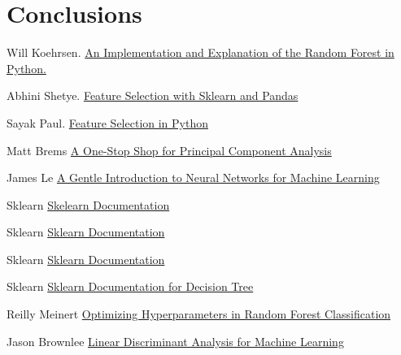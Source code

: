 \documentclass{article}
\begin{document}
\section{Conclusions}

  

\begin{thebibliography}{1}

Will Koehrsen.
\newblock\href{https://towardsdatascience.com/an-implementation-and-explanation-of-the-random-forest-in-python-77bf308a9b76}{ An Implementation and Explanation of the Random Forest in Python.}

Abhini Shetye.
\newblock\href{https://towardsdatascience.com/feature-selection-with-pandas-e3690ad8504b}{Feature Selection with Sklearn and Pandas}

Sayak Paul.
\newblock\href{https://www.datacamp.com/community/tutorials/feature-selection-python}{Feature Selection in Python}

Matt Brems
\newblock\href{https://towardsdatascience.com/a-one-stop-shop-for-principal-component-analysis-5582fb7e0a9c}{A One-Stop Shop for Principal Component Analysis}

James Le
\newblock\href{https://www.codementor.io/@james_aka_yale/a-gentle-introduction-to-neural-networks-for-machine-learning-hkijvz7lp}{A Gentle Introduction to Neural Networks for Machine Learning}

Sklearn
\newblock\href{https://scikit-learn.org/stable/modules/generated/sklearn.linear_model.LogisticRegression.html}{Skelearn Documentation}

Sklearn
\newblock\href{https://scikit-learn.org/0.16/modules/generated/sklearn.qda.QDA.html}{Sklearn Documentation}

Sklearn
\newblock\href{https://scikit-learn.org/stable/modules/generated/sklearn.feature_selection.SelectKBest.html}{Sklearn Documentation}

Sklearn
\newblock\href{https://scikit-learn.org/stable/auto_examples/tree/plot_tree_regression.html}{Sklearn Documentation for Decision Tree}

Reilly Meinert
\newblock\href{https://towardsdatascience.com/optimizing-hyperparameters-in-random-forest-classification-ec7741f9d3f6}{Optimizing Hyperparameters in Random Forest Classification}

Jason Brownlee
\newblock\href{https://machinelearningmastery.com/linear-discriminant-analysis-for-machine-learning/}{Linear Discriminant Analysis for Machine Learning}


\end{thebibliography}
\end{document}
